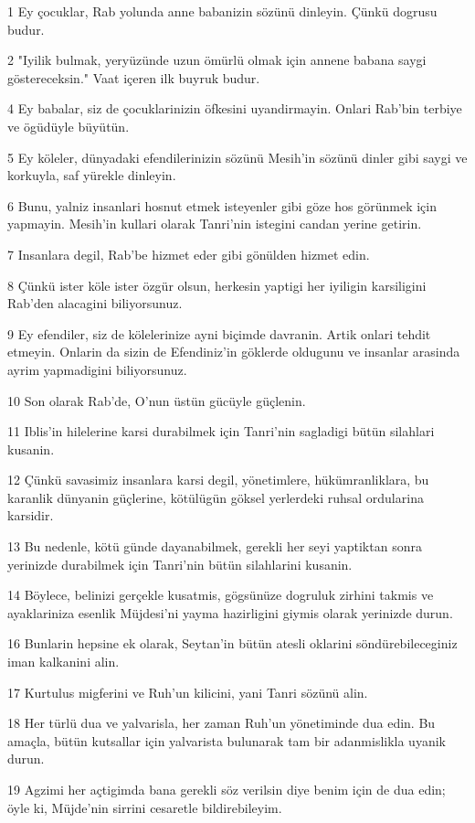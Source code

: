 \par 1 Ey çocuklar, Rab yolunda anne babanizin sözünü dinleyin. Çünkü dogrusu budur.
\par 2 "Iyilik bulmak, yeryüzünde uzun ömürlü olmak için annene babana saygi göstereceksin." Vaat içeren ilk buyruk budur.
\par 4 Ey babalar, siz de çocuklarinizin öfkesini uyandirmayin. Onlari Rab'bin terbiye ve ögüdüyle büyütün.
\par 5 Ey köleler, dünyadaki efendilerinizin sözünü Mesih'in sözünü dinler gibi saygi ve korkuyla, saf yürekle dinleyin.
\par 6 Bunu, yalniz insanlari hosnut etmek isteyenler gibi göze hos görünmek için yapmayin. Mesih'in kullari olarak Tanri'nin istegini candan yerine getirin.
\par 7 Insanlara degil, Rab'be hizmet eder gibi gönülden hizmet edin.
\par 8 Çünkü ister köle ister özgür olsun, herkesin yaptigi her iyiligin karsiligini Rab'den alacagini biliyorsunuz.
\par 9 Ey efendiler, siz de kölelerinize ayni biçimde davranin. Artik onlari tehdit etmeyin. Onlarin da sizin de Efendiniz'in göklerde oldugunu ve insanlar arasinda ayrim yapmadigini biliyorsunuz.
\par 10 Son olarak Rab'de, O'nun üstün gücüyle güçlenin.
\par 11 Iblis'in hilelerine karsi durabilmek için Tanri'nin sagladigi bütün silahlari kusanin.
\par 12 Çünkü savasimiz insanlara karsi degil, yönetimlere, hükümranliklara, bu karanlik dünyanin güçlerine, kötülügün göksel yerlerdeki ruhsal ordularina karsidir.
\par 13 Bu nedenle, kötü günde dayanabilmek, gerekli her seyi yaptiktan sonra yerinizde durabilmek için Tanri'nin bütün silahlarini kusanin.
\par 14 Böylece, belinizi gerçekle kusatmis, gögsünüze dogruluk zirhini takmis ve ayaklariniza esenlik Müjdesi'ni yayma hazirligini giymis olarak yerinizde durun.
\par 16 Bunlarin hepsine ek olarak, Seytan'in bütün atesli oklarini söndürebileceginiz iman kalkanini alin.
\par 17 Kurtulus migferini ve Ruh'un kilicini, yani Tanri sözünü alin.
\par 18 Her türlü dua ve yalvarisla, her zaman Ruh'un yönetiminde dua edin. Bu amaçla, bütün kutsallar için yalvarista bulunarak tam bir adanmislikla uyanik durun.
\par 19 Agzimi her açtigimda bana gerekli söz verilsin diye benim için de dua edin; öyle ki, Müjde'nin sirrini cesaretle bildirebileyim.
